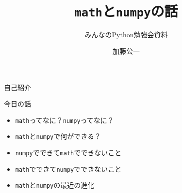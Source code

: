 \documentclass[unicode,lualatex]{beamer}
\title{{\tt math}と{\tt numpy}の話}
\subtitle{みんなのPython勉強会資料}
\date{}
\author{加藤公一}
\begin{document}
\begin{frame}
 \titlepage
\end{frame}
\begin{frame}[fragile]{自己紹介}
\end{frame}
\begin{frame}[fragile]{今日の話}
  \begin{itemize}
  \item {\tt math}ってなに？{\tt numpy}ってなに？
  \item {\tt math}と{\tt numpy}で何ができる？
  \item {\tt numpy}でできて{\tt math}でできないこと
  \item {\tt math}でできて{\tt numpy}でできないこと
  \item {\tt math}と{\tt numpy}の最近の進化
  \end{itemize}
\end{frame}
\end{document}
